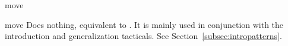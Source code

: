 \begin{tactic}[move]{move}
  \begin{tsyntax}[empty]{move}
     Does nothing, equivalent to . It is mainly
     used in conjunction with the introduction and generalization tacticals.
     See Section~\ref{subsec:intropatterns}.
  \end{tsyntax}
\end{tactic}
